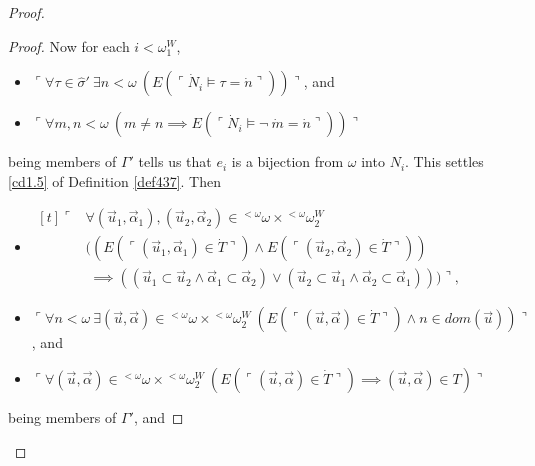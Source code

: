 \documentclass[12pt, twoside]{memoir}
\numberwithin{equation}{section}
\theoremstyle{definition}
\theoremstyle{remark}
\theoremstyle{definition}
\theoremstyle{definition}
\theoremstyle{definition}
\theoremstyle{remark}
\begin{document}
\begin{proof}
\begin{proof}
Now for each $i < \omega_1^W$, 
\begin{itemize}
    \item $\ulcorner \forall \tau \in \hat{\sigma}' \ \exists n < \omega \ (E(\ulcorner \dot{N}_i \models \tau = \dot{n} \urcorner)) \urcorner$, and
    \item $\ulcorner \forall m, n < \omega \ (m \neq n \implies E(\ulcorner \dot{N}_i \models \neg \ \dot{m} = \dot{n} \urcorner)) \urcorner$
\end{itemize}
being members of $\Gamma'$ tells us that $e_i$ is a bijection from $\omega$ into $N_i$. This settles \ref{cd1.5} of Definition \ref{def437}. Then 
\begin{itemize}
    \item 
    \!
    $\begin{aligned}[t]
        \ulcorner & \forall (\Vec{u}_1, \Vec{\alpha}_1), (\Vec{u}_2, \Vec{\alpha}_2) \in {^{< \omega}{\omega}} \times {^{<\omega}{\omega_2^W}} \\
        & ((E(\ulcorner (\Vec{u}_1, \Vec{\alpha}_1) \in \dot{T} \urcorner) \wedge E(\ulcorner (\Vec{u}_2, \Vec{\alpha}_2) \in \dot{T} \urcorner)) \\
        & \mspace{5mu} \implies ((\Vec{u}_1 \subset \Vec{u}_2 \wedge \Vec{\alpha}_1 \subset \Vec{\alpha}_2) \vee (\Vec{u}_2 \subset \Vec{u}_1 \wedge \Vec{\alpha}_2 \subset \Vec{\alpha}_1))) \urcorner \text{,}
    \end{aligned}$
    \item $\ulcorner \forall n < \omega \ \exists (\Vec{u}, \Vec{\alpha}) \in {^{< \omega}{\omega}} \times {^{<\omega}{\omega_2^W}} \ (E(\ulcorner (\Vec{u}, \Vec{\alpha}) \in \dot{T} \urcorner) \wedge n \in dom(\Vec{u})) \urcorner$, and
    \item $\ulcorner \forall (\Vec{u}, \Vec{\alpha}) \in {^{< \omega}{\omega}} \times {^{< \omega}{\omega_2^W}} \ (E(\ulcorner (\Vec{u}, \Vec{\alpha}) \in \dot{T} \urcorner) \implies (\Vec{u}, \Vec{\alpha}) \in T) \urcorner$
\end{itemize}
being members of $\Gamma'$, and 
\end{proof}
\end{proof}
\end{document}
